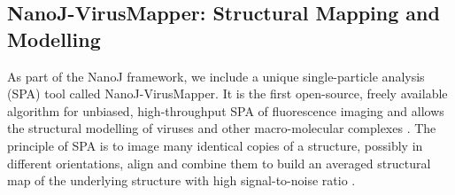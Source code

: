 \subsection*{NanoJ-VirusMapper: Structural Mapping and Modelling}
 As part of the NanoJ framework, we include a unique single-particle analysis (SPA) tool called NanoJ-VirusMapper. It is the first open-source, freely available algorithm for unbiased, high-throughput SPA of fluorescence imaging and allows the structural modelling of viruses and other macro-molecular complexes \cite{gray2016virusmapper,gray2017open,gray2018nanoscale}. The principle of SPA is to image many identical copies of a structure, possibly in different orientations, align and combine them to build an averaged structural map of the underlying structure with high signal-to-noise ratio \cite{Szymborska2013,laine2015structural,lelek2012superresolution} . 
 
